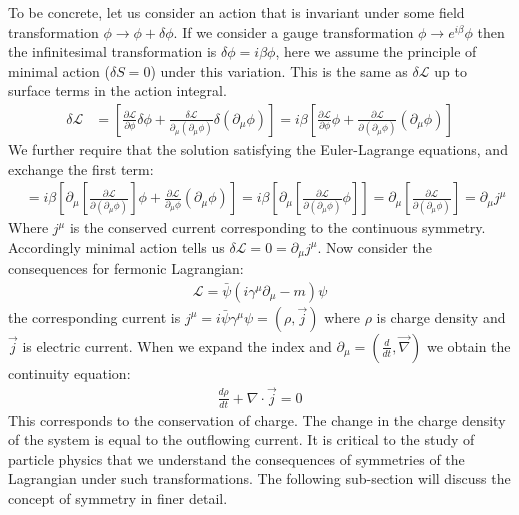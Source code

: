 To be concrete, let us consider an action that is invariant under some field transformation
 $\phi \rightarrow \phi + \delta \phi$. If we consider a gauge transformation $\phi \rightarrow e^{i \beta}\phi$  
then the infinitesimal transformation is $\delta \phi = i \beta \phi$, here we assume the principle of
minimal action ($\delta S =0$) under this variation. This is the same as $\delta \mathcal{L}$ up to surface terms in the action integral. 
\begin{align*}
\delta \mathcal{L} &=  \left [ \frac{\partial \mathcal{L}}{\partial \phi} \delta \phi  + \frac{\delta \mathcal{L}}{\partial_\mu (\partial_\mu \phi)} \delta(\partial_\mu \phi) \right] =
 i\beta \left [ \frac{\partial \mathcal{L}}{\partial \phi}  \phi  + \frac{\partial \mathcal{L}}{\partial (\partial_\mu\phi)} (\partial_\mu \phi) \right]
\end{align*}
We further require that the solution satisfying the Euler-Lagrange equations, and exchange the first term:
\begin{align*}
&= i\beta \left [ \partial_\mu\left [ \frac{\partial \mathcal{L}}{\partial(\partial_\mu \phi)} \right ]  \phi  + \frac{\partial \mathcal{L}}{\partial_\mu \phi} (\partial_\mu \phi) \right] = i\beta \left [ \partial_\mu  \left [  \frac{\partial \mathcal{L}}{\partial(\partial_\mu \phi)}   \phi  \right ] \right ] = \partial_\mu \left [ \frac{\partial \mathcal{L}}{\partial (\partial_\mu \phi) }\right ] = \partial_\mu j^\mu 
\end{align*}
Where $j^\mu$  is the conserved current corresponding to the continuous symmetry. Accordingly minimal action tells us $\delta \mathcal{L} = 0 = \partial_\mu j^\mu$. 
 Now consider the consequences for fermonic Lagrangian:
\begin{align*}
\mathcal{L} = \bar{\psi}(i \gamma^\mu \partial_\mu -m)\psi
\end{align*}
the corresponding current is $j^\mu = i\bar \psi \gamma^\mu \psi = (\rho, \vec j)$ where $\rho$ is charge density and $\vec j$ is electric current.
When we expand the index and $\partial_\mu = (\frac{d}{dt}, \vec \nabla)$ we obtain the continuity equation:
\begin{align*}
\frac{d\rho}{dt} + \nabla \cdot \vec j = 0
\end{align*}
This corresponds to the conservation of charge. The change in the charge density of the system is equal to the outflowing current.
 It is critical to the study of particle physics that we understand the consequences of symmetries of the Lagrangian under such transformations. 
 The following sub-section will discuss the concept of symmetry in finer detail.

